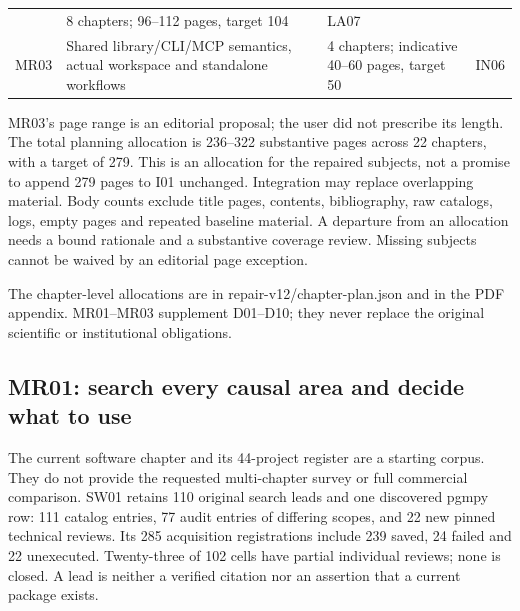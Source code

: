 \documentclass[
  11pt,
  a4paper,
]{article}
\begin{document}
\begin{longtable}[]{@{}llll@{}}
\begin{minipage}[t]{0.22\columnwidth}
\end{minipage} & \begin{minipage}[t]{0.22\columnwidth}\raggedright
8 chapters; 96--112 pages, target 104\strut
\end{minipage} & \begin{minipage}[t]{0.22\columnwidth}\raggedright
LA07\strut
\end{minipage}\tabularnewline
\begin{minipage}[t]{0.22\columnwidth}\raggedright
MR03\strut
\end{minipage} & \begin{minipage}[t]{0.22\columnwidth}\raggedright
Shared library/CLI/MCP semantics, actual workspace and standalone
workflows\strut
\end{minipage} & \begin{minipage}[t]{0.22\columnwidth}\raggedright
4 chapters; indicative 40--60 pages, target 50\strut
\end{minipage} & \begin{minipage}[t]{0.22\columnwidth}\raggedright
IN06\strut
\end{minipage}\tabularnewline
\bottomrule
\end{longtable}

MR03's page range is an editorial proposal; the user did not prescribe
its length. The total planning allocation is 236--322 substantive pages
across 22 chapters, with a target of 279. This is an allocation for the
repaired subjects, not a promise to append 279 pages to I01 unchanged.
Integration may replace overlapping material. Body counts exclude title
pages, contents, bibliography, raw catalogs, logs, empty pages and
repeated baseline material. A departure from an allocation needs a bound
rationale and a substantive coverage review. Missing subjects cannot be
waived by an editorial page exception.

The chapter-level allocations are in repair-v12/chapter-plan.json and in
the PDF appendix. MR01--MR03 supplement D01--D10; they never replace the
original scientific or institutional obligations.

\hypertarget{mr01-search-every-causal-area-and-decide-what-to-use}{%
\subsection{MR01: search every causal area and decide what to
use}\label{mr01-search-every-causal-area-and-decide-what-to-use}}

The current software chapter and its 44-project register are a starting
corpus. They do not provide the requested multi-chapter survey or full
commercial comparison. SW01 retains 110 original search leads and one
discovered pgmpy row: 111 catalog entries, 77 audit entries of differing
scopes, and 22 new pinned technical reviews. Its 285 acquisition
registrations include 239 saved, 24 failed and 22 unexecuted.
Twenty-three of 102 cells have partial individual reviews; none is
closed. A lead is neither a verified citation nor an assertion that a
current package exists.
\end{document}
